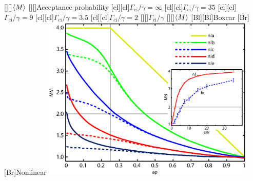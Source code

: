 

 \figstyle
    [][]{$\langle M\rangle$}
    [][]{Acceptance probability}
    [cl][cl]{\figsmaller$\Gamma_\text{ci}/\gamma=\infty$}
    [cl][cl]{\figsmaller$\Gamma_\text{ci}/\gamma=35$}
    [cl][cl]{\figsmaller$\Gamma_\text{ci}/\gamma=9$}
    [cl][cl]{\figsmaller$\Gamma_\text{ci}/\gamma=3.5$}
    [cl][cl]{\figsmaller$\Gamma_\text{ci}/\gamma=2$}
    [][]{\figsmallest$\Gamma_\text{ci}/\gamma$}
    [][]{\figsmallest$\langle M\rangle$}
    [Bl][Bl]{\figsmallest Boxcar}
    [Br][Br]{\figsmallest Nonlinear}
    \includegraphics[width=4in]{ghz4.eps}

